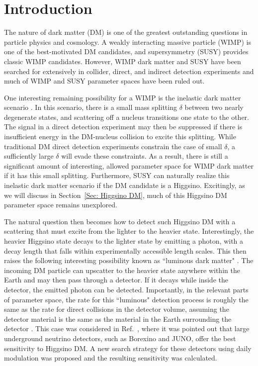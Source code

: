 \documentclass[aps,prd,amsmath,amssymb,10pt,letterpaper,balancelastpage,showpacs,superscriptaddress,nofootinbib,floatfix,notitlepage,longbibliography,twocolumn
]{revtex4-2}
\begin{document}

\section{Introduction}

The nature of dark matter (DM) is one of the greatest outstanding questions in particle physics and cosmology.  A weakly interacting massive particle (WIMP) is one of the best-motivated DM candidates, and supersymmetry (SUSY) provides classic WIMP candidates.  However, WIMP dark matter and SUSY have been searched for extensively in collider, direct, and indirect detection experiments and much of WIMP and SUSY parameter spaces have been ruled out.

One interesting remaining possibility for a WIMP is the inelastic dark matter scenario \cite{Hall:1997ah, Tucker-Smith:2001myb}.  In this scenario, there is a small mass splitting $\delta$ between two nearly degenerate states, and scattering off a nucleus transitions one state to the other.  The signal in a direct detection experiment may then be suppressed if there is insufficient energy in the DM-nucleus collision to excite this splitting.  While traditional DM direct detection experiments constrain the case of small $\delta$, a sufficiently large $\delta$ will evade these constraints.  As a result, there is still a significant amount of interesting, allowed parameter space for WIMP dark matter if it has this small splitting.  Furthermore, SUSY can naturally realize this inelastic dark matter scenario if the DM candidate is a Higgsino.  Excitingly, as we will discuss in Section~\ref{Sec: Higgsino DM}, much of this Higgsino DM parameter space remains unexplored.

The natural question then becomes how to detect such Higgsino DM with a scattering that must excite from the lighter to the heavier state.  Interestingly, the heavier Higgsino state decays to the lighter state by emitting a photon, with a decay length that falls within experimentally accessible length scales. 
 This then raises the following interesting possibility known as ``luminous dark matter" \cite{LuminousDM}.  The incoming DM particle can upscatter to the heavier state anywhere within the Earth and may then pass through a detector.  If it decays while inside the detector, the emitted photon can be detected.  Importantly, in the relevant parts of parameter space, the rate for this ``luminous" detection process is roughly the same as the rate for direct collisions in the detector volume, assuming the detector material is the same as the material in the Earth surrounding the detector \cite{LuminousDM}.  This case was considered in Ref.~\cite{Luminous}, where it was pointed out that large underground neutrino detectors, such as Borexino and JUNO, offer the best sensitivity to Higgsino DM.  A new search strategy for these detectors using daily modulation was proposed and the resulting sensitivity was calculated.
 
\end{document}
